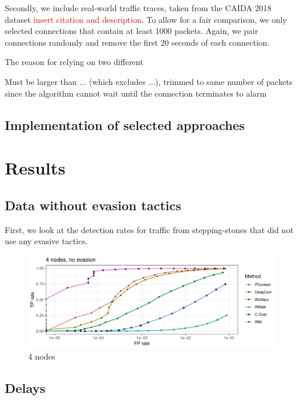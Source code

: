 \documentclass[runningheads]{llncs}\usepackage[]{graphicx}\usepackage[]{color}
\makeatletter
\def\maxwidth{ %
  \ifdim\Gin@nat@width>\linewidth
    \linewidth
  \else
    \Gin@nat@width
  \fi
}
\newenvironment{knitrout}{}{} %
\makeatother
\begin{document}
Secondly, we include real-world traffic traces, taken from the CAIDA 2018 dataset \textcolor{red}{insert citation and description}. To allow for a fair comparison, we only selected connections that contain at least 1000 packets. Again, we pair connections randomly and remove the first 20 seconds of each connection. 


The reason for relying on two different 

Must be larger than ... (which excludes ...), trimmed to same number of packets since the algorithm cannot wait until the connection terminates to alarm

\subsection{Implementation of selected approaches}


\section{Results}


\subsection{Data without evasion tactics}

First, we look at the detection rates for traffic from stepping-stones that did not use any evasive tactics. 

\begin{knitrout}
\color{fgcolor}\begin{figure}
\includegraphics[width=\maxwidth]{figure/Noevasion_4nodes-1} \caption[4 nodes]{4 nodes}\label{fig:Noevasion_4nodes}
\end{figure}


\end{knitrout}

\subsection{Delays}
\end{document}
